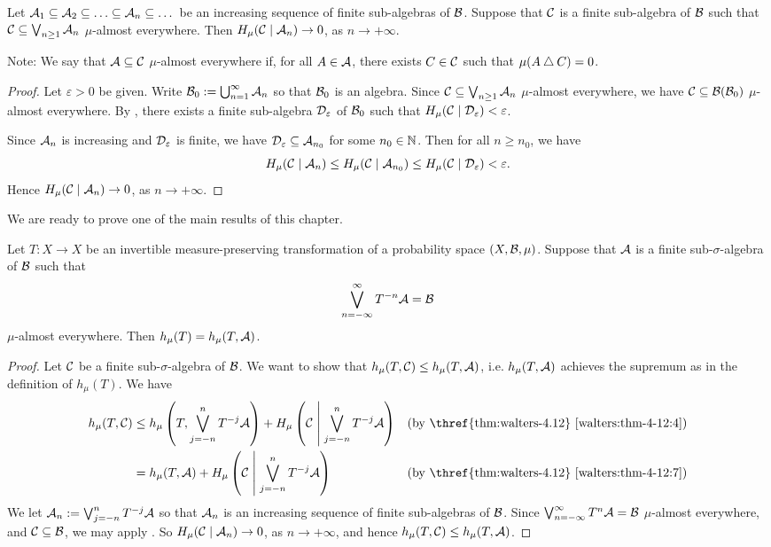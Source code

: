 \begin{corollary} \label{cor:walters-4-16-1}
	Let $\A_1 \subset \A_2 \subset \dots \subset \A_n \subset \dots$ be an increasing sequence of finite sub-algebras of $\mathcal{B}$. Suppose that $\mathcal{C}$ is a finite sub-algebra of $\mathcal{B}$ such that $\mathcal{C} \subseteq \bigvee_{n \geq 1}{\mathcal{A}_n}$ $\mu$-almost everywhere. Then $H_\mu(\mathcal{C} \mid \mathcal{A}_n) \to 0$, as $n \to +\infty$.
	
	Note: We say that $\mathcal{A} \subseteq \mathcal{C}$ $\mu$-almost everywhere if, for all $A \in \mathcal{A}$, there exists $C \in \mathcal{C}$ such that $\mu(A \bigtriangleup C) = 0$.
	
	\begin{proof}
		Let $\varepsilon > 0$ be given. Write $\mathcal{B}_0 := \bigcup_{n = 1}^\infty{\mathcal{A}_n}$ so that $\mathcal{B}_0$ is an algebra. Since $\mathcal{C} \subseteq \bigvee_{n \geq 1}{\mathcal{A}_n}$ $\mu$-almost everywhere, we have $\mathcal{C} \subseteq \mathcal{B}(\mathcal{B}_0)$ $\mu$-almost everywhere. By , there exists a finite sub-algebra $\mathcal{D}_\varepsilon$ of $\mathcal{B}_0$ such that $H_\mu(\mathcal{C} \mid \mathcal{D}_\varepsilon) < \varepsilon$.
		
		Since $\mathcal{A}_n$ is increasing and $\mathcal{D}_\varepsilon$ is finite, we have $\mathcal{D}_\varepsilon \subseteq \mathcal{A}_{n_0}$ for some $n_0 \in \mathbb{N}$. Then for all $n \geq n_0$, we have
		\[
			H_\mu(\mathcal{C} \mid \mathcal{A}_n) \leq H_\mu(\mathcal{C} \mid \mathcal{A}_{n_0}) \leq H_\mu(\mathcal{C} \mid \mathcal{D}_\varepsilon) < \varepsilon.
		\]
		Hence $H_\mu(\mathcal{C} \mid \mathcal{A}_n) \to 0$, as $n \to +\infty$.
	\end{proof}
\end{corollary}

We are ready to prove one of the main results of this chapter.

\begin{theorem} \label{thm:kolmogorov-sinai}
	Let $T : X \to X$ be an invertible measure-preserving transformation of a probability space $(X, \mathcal{B}, \mu)$. Suppose that $\mathcal{A}$ is a finite sub-$\sigma$-algebra of $\mathcal{B}$ such that
	\[
		\bigvee_{n = -\infty}^\infty{T^{-n}{\mathcal{A}}} = \mathcal{B}
	\]
	$\mu$-almost everywhere. Then $h_\mu(T) = h_\mu(T, \mathcal{A})$.
	
	\begin{proof}
		Let $\mathcal{C}$ be a finite sub-$\sigma$-algebra of $\mathcal{B}$. We want to show that $h_\mu(T, \mathcal{C}) \leq h_\mu(T, \mathcal{A})$, i.e. $h_\mu(T, \mathcal{A})$ achieves the supremum as in the definition of $h_\mu(T)$. We have
		\begin{align*}
			h_\mu(T, \C) &\leq h_\mu\left(T, \bigjoin_{j = -n}^n{T^{-j}{\A}}\right) + H_\mu\left(\C \midmid \bigjoin_{j = -n}^n{T^{-j}{\A}}\right) & \text{(by \thref{thm:walters-4.12} \ref{walters:thm-4-12:4})} \\
				&= h_\mu(T, \A) + H_\mu\left(\C \midmid \bigjoin_{j = -n}^n{T^{-j}{\A}} \right) & \text{(by \thref{thm:walters-4.12} \ref{walters:thm-4-12:7})}
		\end{align*}
		We let $\mathcal{A}_n := \bigvee_{j = -n}^n{T^{-j}{\mathcal{A}}}$ so that $\mathcal{A}_n$ is an increasing sequence of finite sub-algebras of $\mathcal{B}$. Since $\bigvee_{n = -\infty}^\infty{T^n{\mathcal{A}}} = \mathcal{B}$ $\mu$-almost everywhere, and $\mathcal{C} \subseteq \mathcal{B}$, we may apply . So $H_\mu(\mathcal{C} \mid \mathcal{A}_n) \to 0$, as $n \to +\infty$, and hence $h_\mu(T, \mathcal{C}) \leq h_\mu(T, \mathcal{A})$.
	\end{proof}
\end{theorem}

